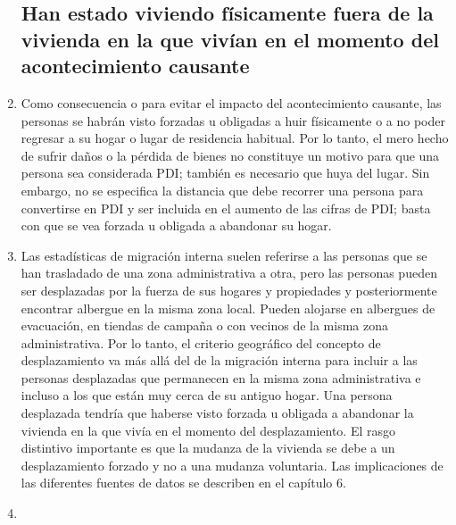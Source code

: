 \documentclass[
]{book}
\begin{document}
\begin{enumerate}
{  \subsection{Han estado viviendo físicamente fuera de la vivienda en la que vivían en el momento del acontecimiento causante}\label{han-estado-viviendo-fuxedsicamente-fuera-de-la-vivienda-en-la-que-vivuxedan-en-el-momento-del-acontecimiento-causante}}
\item
  Como consecuencia o para evitar el impacto del acontecimiento causante, las personas se habrán visto forzadas u obligadas a huir físicamente o a no poder regresar a su hogar o lugar de residencia habitual. Por lo tanto, el mero hecho de sufrir daños o la pérdida de bienes no constituye un motivo para que una persona sea considerada PDI; también es necesario que huya del lugar. Sin embargo, no se especifica la distancia que debe recorrer una persona para convertirse en PDI y ser incluida en el aumento de las cifras de PDI; basta con que se vea forzada u obligada a abandonar su hogar.
\item
  Las estadísticas de migración interna suelen referirse a las personas que se han trasladado de una zona administrativa a otra, pero las personas pueden ser desplazadas por la fuerza de sus hogares y propiedades y posteriormente encontrar albergue en la misma zona local. Pueden alojarse en albergues de evacuación, en tiendas de campaña o con vecinos de la misma zona administrativa. Por lo tanto, el criterio geográfico del concepto de desplazamiento va más allá del de la migración interna para incluir a las personas desplazadas que permanecen en la misma zona administrativa e incluso a los que están muy cerca de su antiguo hogar. Una persona desplazada tendría que haberse visto forzada u obligada a abandonar la vivienda en la que vivía en el momento del desplazamiento. El rasgo distintivo importante es que la mudanza de la vivienda se debe a un desplazamiento forzado y no a una mudanza voluntaria. Las implicaciones de las diferentes fuentes de datos se describen en el capítulo 6.
\item ~
  \hypertarget{se-encuentran-dentro-de-las-fronteras-internacionalmente-reconocidas-del-pauxeds}{%
}
\end{enumerate}
\end{document}
